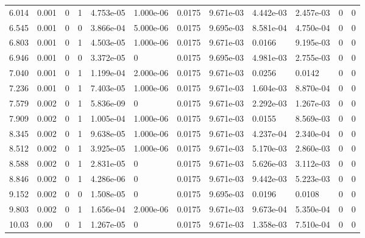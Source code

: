 \documentclass[preview]{standalone}
\begin{document}
{{\begin{tabular}{L{1.2cm}C{1.2cm} C{0.3cm}C{0.5cm} C{1.4cm}C{1.4cm} C{1.4cm}C{1.4cm} C{1.6cm}C{1.6cm} C{1.6cm}C{1.6cm}}
  6.014  &  0.001  & 0     &  1 &  4.753e-05  & 1.000e-06  &  0.0175&   9.671e-03& 4.442e-03 & 2.457e-03   &  0 & 0  \\ 
  6.545  &  0.001  & 0     &  0 &  3.866e-04  & 5.000e-06  &  0.0175&   9.695e-03& 8.581e-04 & 4.750e-04   &  0 & 0  \\ 
  6.803  &  0.001  & 0     &  1 &  4.503e-05  & 1.000e-06  &  0.0175&   9.671e-03& 0.0166 & 9.195e-03   &  0 & 0  \\ 
  6.946  &  0.001  & 0     &  0 &  3.372e-05  & 0  &  0.0175&   9.695e-03& 4.981e-03 & 2.755e-03   &  0 & 0  \\ 
  7.040  &  0.001  & 0     &  1 &  1.199e-04  & 2.000e-06  &  0.0175&   9.671e-03& 0.0256 & 0.0142   &  0 & 0  \\ 
  7.236  &  0.001  & 0     &  1 &  7.403e-05  & 1.000e-06  &  0.0175&   9.671e-03& 1.604e-03 & 8.870e-04   &  0 & 0  \\ 
  7.579  &  0.002  & 0     &  1 &  5.836e-09  & 0  &  0.0175&   9.671e-03& 2.292e-03 & 1.267e-03   &  0 & 0  \\ 
  7.909  &  0.002  & 0     &  1 &  1.005e-04  & 1.000e-06  &  0.0175&   9.671e-03& 0.0155 & 8.569e-03   &  0 & 0  \\ 
  8.345  &  0.002  & 0     &  1 &  9.638e-05  & 1.000e-06  &  0.0175&   9.671e-03& 4.237e-04 & 2.340e-04   &  0 & 0  \\ 
  8.512  &  0.002  & 0     &  1 &  3.925e-05  & 1.000e-06  &  0.0175&   9.671e-03& 5.170e-03 & 2.860e-03   &  0 & 0  \\ 
  8.588  &  0.002  & 0     &  1 &  2.831e-05  & 0  &  0.0175&   9.671e-03& 5.626e-03 & 3.112e-03   &  0 & 0  \\ 
  8.846  &  0.002  & 0     &  1 &  4.286e-06  & 0  &  0.0175&   9.671e-03& 9.442e-03 & 5.223e-03   &  0 & 0  \\ 
  9.152  &  0.002  & 0     &  0 &  1.508e-05  & 0  &  0.0175&   9.695e-03& 0.0196 & 0.0108   &  0 & 0  \\ 
  9.803  &  0.002  & 0     &  1 &  1.656e-04  & 2.000e-06  &  0.0175&   9.671e-03& 9.673e-04 & 5.350e-04   &  0 & 0  \\ 
  10.03  &  0.00  & 0     &  1 &  1.267e-05  & 0  &  0.0175&   9.671e-03& 1.358e-03 & 7.510e-04   &  0 & 0  \\ 
\hline 
\end{tabular} 

}}
\end{document}
